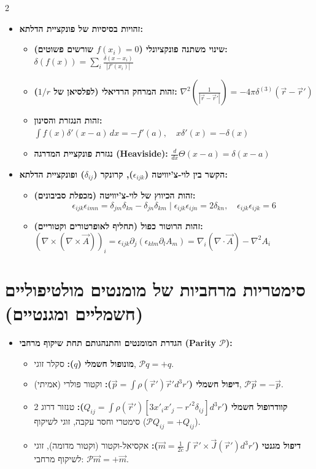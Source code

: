 \documentclass[10pt,a4paper]{article}
\begin{document}
\begin{multicols*}{2}
\begin{itemize}[leftmargin=*]
    \item \textbf{זהויות בסיסיות של פונקציית הדלתא:}
    \begin{itemize}
        \item \textbf{שינוי משתנה פונקציונלי ($f(x_i)=0$ שורשים פשוטים):} $\delta(f(x)) = \sum_{i} \frac{\delta(x - x_i)}{|f'(x_i)|}$
        \item \textbf{זהות המרחק הרדיאלי (לפלסיאן של $1/r$):} $\nabla^2 \left( \frac{1}{|\vec{r} - \vec{r}'|} \right) = -4\pi \delta^{(3)}(\vec{r} - \vec{r}')$
        \item \textbf{זהות הנגזרת והסינון:} $\int f(x) \delta'(x - a) \, dx = -f'(a), \quad x \delta'(x) = -\delta(x)$
        \item \textbf{נגזרת פונקציית המדרגה (Heaviside):} $\frac{d}{dx}\Theta(x - a) = \delta(x - a)$
    \end{itemize}

    \item \textbf{הקשר בין לוי-צ'יוויטה ($\epsilon_{ijk}$), קרונקר ($\delta_{ij}$) ופונקציית הדלתא:}
    \begin{itemize}
        \item \textbf{זהות הכיווץ של לוי-צ'יוויטה (מכפלת סביבונים):}
        $$\epsilon_{ijk} \epsilon_{imn} = \delta_{jm}\delta_{kn} - \delta_{jn}\delta_{km} \mid \epsilon_{ijk} \epsilon_{ijn} = 2\delta_{kn}, \quad \epsilon_{ijk} \epsilon_{ijk} = 6$$
        \item \textbf{זהות הרוטור כפול (תחליף לאופרטורים וקטוריים):}\\
        $(\nabla \times (\nabla \times \vec{A}))_i = \epsilon_{ijk} \partial_j (\epsilon_{klm} \partial_l A_m) = \nabla_i (\nabla \cdot \vec{A}) - \nabla^2 A_i$
    \end{itemize}
\end{itemize}

\section{סימטריות מרחביות של מומנטים מולטיפוליים (חשמליים ומגנטיים)}

\begin{itemize}[leftmargin=*]
    \item \textbf{הגדרת המומנטים והתנהגותם תחת שיקוף מרחבי \textenglish{(Parity $\mathcal{P}$)}:}
    \begin{itemize}
        \item \textbf{מונופול חשמלי ($q$):} סקלר זוגי, $\mathcal{P} q = +q$.
        \item \textbf{דיפול חשמלי ($\vec{p} = \int \rho(\vec{r}') \vec{r}' d^3r'$):} וקטור פולרי (אמיתי), $\mathcal{P} \vec{p} = -\vec{p}$.
        \item \textbf{קוודרופול חשמלי ($Q_{ij} = \int \rho(\vec{r}') [3x'_i x'_j - r'^2 \delta_{ij}] d^3r'$):} טנזור דרוג 2 סימטרי וחסר עקבה, זוגי לשיקוף ($\mathcal{P} Q_{ij} = +Q_{ij}$).
        \item \textbf{דיפול מגנטי ($\vec{m} = \frac{1}{2c} \int \vec{r}' \times \vec{J}(\vec{r}') d^3r'$):} אקסיאל-וקטור (וקטור מדומה), זוגי לשיקוף מרחבי: $\mathcal{P} \vec{m} = +\vec{m}$.
    \end{itemize}


\end{itemize}
\end{multicols*}
\end{document}

